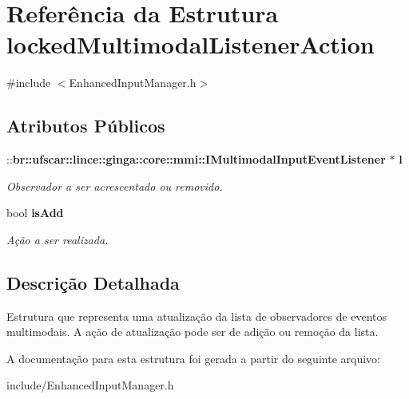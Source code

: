\section{Referência da Estrutura lockedMultimodalListenerAction}
\label{structlockedMultimodalListenerAction}


{\ttfamily \#include $<$EnhancedInputManager.h$>$}

\subsection*{Atributos Públicos}
\begin{DoxyCompactItemize}
\item 
::{\bf br::ufscar::lince::ginga::core::mmi::IMultimodalInputEventListener} $\ast$ {\bf l}\label{structlockedMultimodalListenerAction_ae50b56d7584d1787ceb2bf9cc739821c}

\begin{DoxyCompactList}\small\item\em Observador a ser acrescentado ou removido. \item\end{DoxyCompactList}\item 
bool {\bf isAdd}\label{structlockedMultimodalListenerAction_a5f870f74fde0271b1763a95549dd29eb}

\begin{DoxyCompactList}\small\item\em Ação a ser realizada. \item\end{DoxyCompactList}\end{DoxyCompactItemize}


\subsection{Descrição Detalhada}
Estrutura que representa uma atualização da lista de observadores de eventos multimodais. A ação de atualização pode ser de adição ou remoção da lista. 

A documentação para esta estrutura foi gerada a partir do seguinte arquivo:\begin{DoxyCompactItemize}
\item 
include/EnhancedInputManager.h\end{DoxyCompactItemize}
